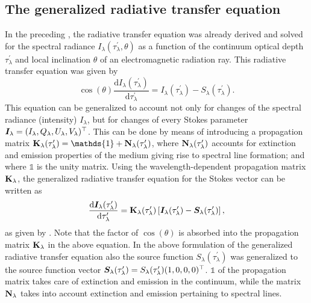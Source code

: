 \documentclass[a4paper,11pt]{report}
\def\fc#1{{\color{black}{#1}}} %
\def\lk#1{{\color{black}{#1}}}
\begin{document}
\subsection{The generalized radiative transfer equation}
In the preceding \lk{sections}, the radiative transfer equation was already derived and solved for the spectral radiance $I_\lambda(\tau_\lambda^\prime, \theta)$ as a function of the continuum optical depth $\tau_\lambda^\prime$ and local inclination $\theta$ of an electromagnetic radiation ray. This radiative transfer equation was given by \begin{equation}
\cos(\theta)\frac{\mathrm{d}I_\lambda(\tau_\lambda^\prime)}{\mathrm{d}\tau_\lambda^\prime} = I_\lambda(\tau_\lambda^\prime)-S_\lambda(\tau_\lambda^\prime).
\end{equation} This equation can be generalized to account not only for changes of the spectral radiance (intensity) $I_\lambda$, but for changes of every Stokes parameter $\bm{I}_\lambda = (I_\lambda, Q_\lambda, U_\lambda, V_\lambda)^\top$. This can be done by means of introducing a propagation matrix $\matr{K}_\lambda(\tau_\lambda^\prime) = \mathds{1} + \matr{N}_\lambda(\tau_\lambda^\prime)$, where $\boldsymbol{\mathbf{N}}_\lambda(\tau_\lambda^\prime)$ accounts for extinction and emission properties of the medium giving rise to spectral line formation; and where $\mathds{1}$ is the unity matrix. Using the wavelength-dependent propagation matrix $\boldsymbol{\mathbf{K}}_\lambda$, the generalized radiative transfer equation for the Stokes vector can be written as \begin{equation}\label{eq:generalizedradtransfereq}
\frac{\mathrm{d}\bm{I}_\lambda(\tau_\lambda^\prime)}{\mathrm{d}\tau_\lambda^\prime} = \boldsymbol{\mathbf{K}}_\lambda(\tau_\lambda^\prime)\left[\bm{I}_\lambda(\tau_\lambda^\prime)-\bm{S}_\lambda(\tau_\lambda^\prime)\right],
\end{equation} as given by \cite[p.150]{delToroIniesta.2003}. Note that the factor of $\cos(\theta)$ is absorbed into the propagation matrix $\boldsymbol{\mathbf{K}}_\lambda$ in the above equation. In the above formulation of the generalized radiative transfer equation also the source function $S_\lambda(\tau_\lambda^\prime)$ was generalized to the source function vector $\bm{S}_\lambda(\tau_\lambda^\prime) = S_\lambda(\tau_\lambda^\prime)(1,0,0,0)^\top$. \fc{The unity matrix} $\mathds{1}$ of the propagation matrix takes care of extinction and emission in the continuum, while the matrix $\boldsymbol{\mathbf{N}}_\lambda$ takes into account extinction and emission pertaining to spectral lines. 
\end{document}
